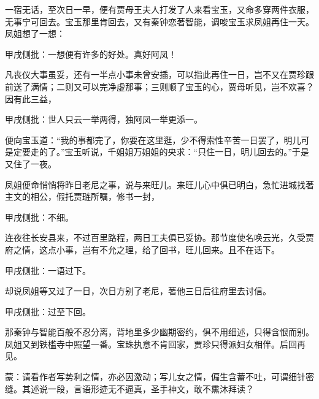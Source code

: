 \begin{parag}
    一宿无话，至次日一早，便有贾母王夫人打发了人来看宝玉，又命多穿两件衣服，无事宁可回去。宝玉那里肯回去，又有秦钟恋著智能，调唆宝玉求凤姐再住一天。凤姐想了一想：\begin{note}甲戌侧批：一想便有许多的好处。真好阿凤！\end{note}凡丧仪大事虽妥，还有一半点小事未曾安插，可以指此再住一日，岂不又在贾珍跟前送了满情；二则又可以完净虚那事；三则顺了宝玉的心，贾母听见，岂不欢喜？因有此三益，\begin{note}甲戌侧批：世人只云一举两得，独阿凤一举更添一。\end{note}便向宝玉道：“我的事都完了，你要在这里逛，少不得索性辛苦一日罢了，明儿可是定要走的了。”宝玉听说，千姐姐万姐姐的央求：“只住一日，明儿回去的。”于是又住了一夜。
\end{parag}


\begin{parag}
    凤姐便命悄悄将昨日老尼之事，说与来旺儿。来旺儿心中俱已明白，急忙进城找著主文的相公，假托贾琏所嘱，修书一封，\begin{note}甲戌侧批：不细。\end{note}连夜往长安县来，不过百里路程，两日工夫俱已妥协。那节度使名唤云光，久受贾府之情，这点小事，岂有不允之理，给了回书，旺儿回来。且不在话下。\begin{note}甲戌侧批：一语过下。\end{note}
\end{parag}


\begin{parag}
    却说凤姐等又过了一日，次日方别了老尼，著他三日后往府里去讨信。\begin{note}甲戌侧批：过至下回。\end{note}那秦钟与智能百般不忍分离，背地里多少幽期密约，俱不用细述，只得含恨而别。凤姐又到铁槛寺中照望一番。宝珠执意不肯回家，贾珍只得派妇女相伴。后回再见。
\end{parag}


\begin{parag}
    \begin{note}蒙：请看作者写势利之情，亦必因激动；写儿女之情，偏生含蓄不吐，可谓细针密缝。其述说一段，言语形迹无不逼真，圣手神文，敢不熏沐拜读？\end{note}
\end{parag}